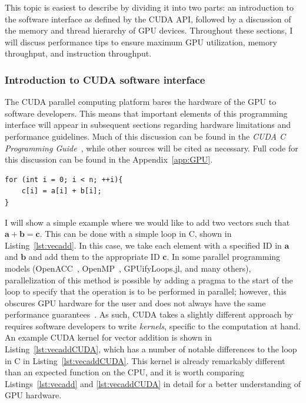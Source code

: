 This topic is easiest to describe by dividing it into two parts: an introduction to the software interface as defined by the CUDA API, followed by a discussion of the memory and thread hierarchy of GPU devices.
Throughout these sections, I will discuss performance tips to ensure maximum GPU utilization, memory throughput, and instruction throughput.

\subsubsection{Introduction to CUDA software interface}

The CUDA parallel computing platform bares the hardware of the GPU to software developers.
This means that important elements of this programming interface will appear in subsequent sections regarding hardware limitations and performance guidelines.
Much of this discussion can be found in the \textit{CUDA C Programming Guide}~\cite{CUDAPG}, while other sources will be cited as necessary.
Full code for this discussion can be found in the Appendix~\ref{app:GPU}.

\begin{lstlisting}[float,label=lst:vecadd,caption={An example of vector addition performed in C or C++ for $a$, $b$, and $c$, all of size $n$},style=c++]
for (int i = 0; i < n; ++i){
    c[i] = a[i] + b[i];
}
\end{lstlisting}

I will show a simple example where we would like to add two vectors such that $\mathbf{a} + \mathbf{b} = \mathbf{c}$.
This can be done with a simple loop in C, shown in Listing~\ref{lst:vecadd}.
In this case, we take each element with a specified ID in $\mathbf{a}$ and $\mathbf{b}$ and add them to the appropriate ID $\mathbf{c}$.
In some parallel programming models (OpenACC~\cite{wienke2012}, OpenMP~\cite{chandra2001}, GPUifyLoops.jl, and many others), parallelization of this method is possible by adding a pragma to the start of the loop to specify that the operation is to be performed in parallel; however, this obscures GPU hardware for the user and does not always have the same performance guarantees~\cite{reyes2012}.
As such, CUDA takes a slightly different approach by requires software developers to write \textit{kernels}, specific to the computation at hand.
An example CUDA kernel for vector addition is shown in Listing~\ref{lst:vecaddCUDA}, which has a number of notable differences to the loop in C in Listing~\ref{lst:vecaddCUDA}.
This kernel is already remarkably different than an expected function on the CPU, and it is worth comparing Listings~\ref{lst:vecadd} and \ref{lst:vecaddCUDA} in detail for a better understanding of GPU hardware.

